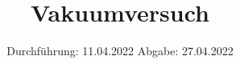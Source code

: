 

\subject{Versuch Nr.V70}
\title{Vakuumversuch}
\date{%
  Durchführung: 11.04.2022
  \hspace{3em}
  Abgabe: 27.04.2022
}



\maketitle
\thispagestyle{empty}
\tableofcontents
\newpage 








\nocite{*}

\printbibliography{}


